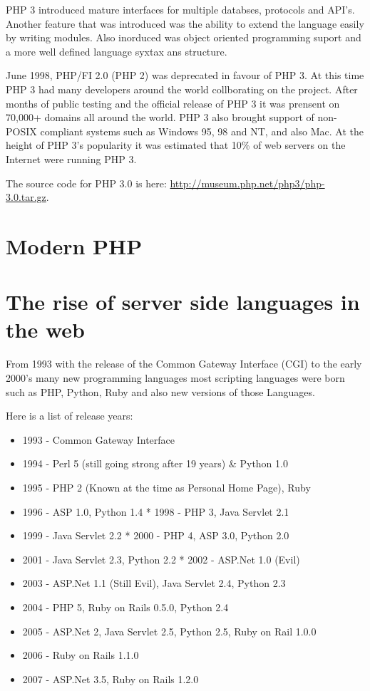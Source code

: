 \documentclass{book}
\begin{document}
PHP 3 introduced mature interfaces for multiple databses, protocols and API's. Another feature that was introduced was the ability to extend the language easily by writing modules. Also inorduced was object oriented programming suport and a more well defined language syxtax ans structure.

June 1998, PHP/FI 2.0 (PHP 2) was deprecated in favour of PHP 3. At this time PHP 3 had many developers around the world collborating on the project. After months of public testing and the official release of PHP 3 it was prensent on 70,000+ domains all around the world. PHP 3 also brought support of non-POSIX compliant systems such as Windows 95, 98 and NT, and also Mac. At the height of PHP 3's popularity it was estimated that 10\% of web servers on the Internet were running PHP 3.

The source code for PHP 3.0 is here: \href{http://museum.php.net/php3/php-3.0.tar.gz}{http://museum.php.net/php3/php-3.0.tar.gz}.

\chapter{Modern PHP}



\chapter{The rise of server side languages in the web}
From 1993 with the release of the Common Gateway Interface (CGI) to the early 2000's many new programming languages most scripting languages were born such as PHP, Python, Ruby and also new versions of those Languages.

Here is a list of release years\cite{royal-pingdom}: 

\begin{itemize}
\item 1993 - Common Gateway Interface 
\item 1994 - Perl 5 (still going strong after 19 years) \& Python 1.0 
\item 1995 - PHP 2 (Known at the time as Personal Home Page), Ruby 
\item 1996 - ASP 1.0, Python 1.4 * 1998 - PHP 3, Java Servlet 2.1 
\item 1999 - Java Servlet 2.2 * 2000 - PHP 4, ASP 3.0, Python 2.0
\item 2001 - Java Servlet 2.3, Python 2.2 * 2002 - ASP.Net 1.0 (Evil)
\item 2003 - ASP.Net 1.1 (Still Evil), Java Servlet 2.4, Python 2.3 
\item 2004 - PHP 5, Ruby on Rails 0.5.0, Python 2.4 
\item 2005 - ASP.Net 2, Java Servlet 2.5, Python 2.5, Ruby on Rail 1.0.0 
\item 2006 - Ruby on Rails 1.1.0
\item 2007 - ASP.Net 3.5, Ruby on Rails 1.2.0
\end{itemize}
\end{document}
